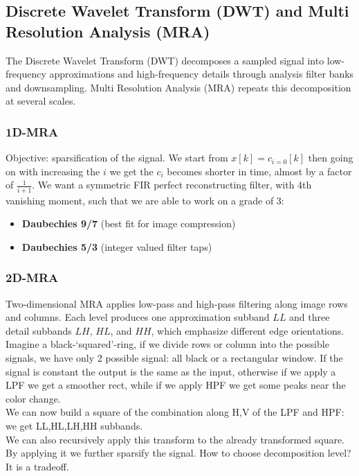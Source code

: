 \subsection{Discrete Wavelet Transform (DWT) and Multi Resolution Analysis (MRA)}
The Discrete Wavelet Transform (DWT) decomposes a sampled signal into low-frequency approximations and high-frequency details through analysis filter banks and downsampling. Multi Resolution Analysis (MRA) repeats this decomposition at several scales.
\subsubsection{1D-MRA}
Objective: sparsification of the signal. We start from $x[k] = c_{i=0}[k]$ then going on with increasing the $i$ we get the $c_i$ becomes shorter in time, almost by a factor of $\frac{1}{i+1}$.
We want a symmetric FIR perfect reconstructing filter, with 4th vanishing moment, such that we are able to work on a grade of 3:
\begin{itemize}
    \item \textbf{Daubechies 9/7} (best fit for image compression)
    \item \textbf{Daubechies 5/3} (integer valued filter taps)
\end{itemize}
\subsubsection{2D-MRA}
Two-dimensional MRA applies low-pass and high-pass filtering along image rows and columns. Each level produces one approximation subband $LL$ and three detail subbands $LH$, $HL$, and $HH$, which emphasize different edge orientations.
Imagine a black-`squared'-ring, if we divide rows or column into the possible signals, we have only 2 possible signal: all black or a rectangular window.
If the signal is constant the output is the same as the input, otherwise if we apply a LPF we get a smoother rect, while if we apply HPF we get some peaks near the color change.\\
We can now build a square of the combination along H,V of the LPF and HPF: we get LL,HL,LH,HH subbands.\\
We can also recursively apply this transform to the already transformed square.\\
By applying it we further sparsify the signal. How to choose decomposition level? It is a tradeoff.
